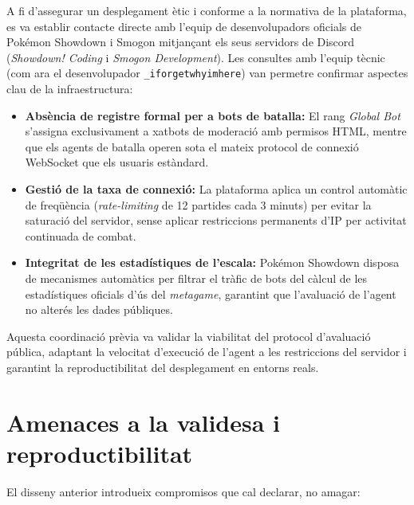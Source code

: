 A fi d'assegurar un desplegament ètic i conforme a la normativa de la plataforma, es va establir contacte directe amb l'equip de desenvolupadors oficials de Pokémon Showdown i Smogon mitjançant els seus servidors de Discord (\emph{Showdown! Coding} i \emph{Smogon Development}). Les consultes amb l'equip tècnic (com ara el desenvolupador \texttt{\_iforgetwhyimhere}) van permetre confirmar aspectes clau de la infraestructura:
\begin{itemize}
    \item \textbf{Absència de registre formal per a bots de batalla:} El rang \emph{Global Bot} s'assigna exclusivament a xatbots de moderació amb permisos HTML, mentre que els agents de batalla operen sota el mateix protocol de connexió WebSocket que els usuaris estàndard.
    \item \textbf{Gestió de la taxa de connexió:} La plataforma aplica un control automàtic de freqüència (\emph{rate-limiting} de 12 partides cada 3 minuts) per evitar la saturació del servidor, sense aplicar restriccions permanents d'IP per activitat continuada de combat.
    \item \textbf{Integritat de les estadístiques de l'escala:} Pokémon Showdown disposa de mecanismes automàtics per filtrar el tràfic de bots del càlcul de les estadístiques oficials d'ús del \emph{metagame}, garantint que l'avaluació de l'agent no alterés les dades públiques.
\end{itemize}

Aquesta coordinació prèvia va validar la viabilitat del protocol d'avaluació pública, adaptant la velocitat d'execució de l'agent a les restriccions del servidor i garantint la reproductibilitat del desplegament en entorns reals.

\section{Amenaces a la validesa i reproductibilitat}
\label{sec:validesa}

El disseny anterior introdueix compromisos que cal declarar, no amagar:


